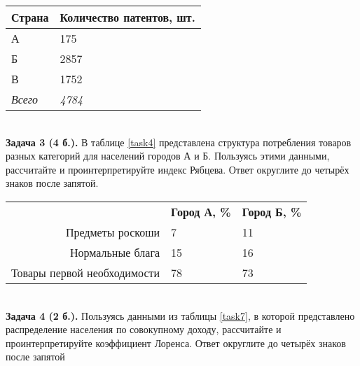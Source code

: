 \documentclass{article}
\begin{document}
\begin{minipage}{\textwidth}
\centering
\begin{tabularx}{0.4\textwidth}{YY}
\toprule
\textbf{Страна} & \textbf{Количество патентов, шт.} \\
\midrule
А & 175 \\

Б & 2857 \\

В & 1752 \\
\addlinespace
\textit{Всего} & \textit{4784} \\
\bottomrule
\end{tabularx}
\label{task9}
\end{minipage} \\[35pt]

\textbf{Задача 3 (4 б.).} В таблице \ref{task4} представлена структура потребления товаров разных категорий для населений городов А и Б. Пользуясь этими данными, рассчитайте и проинтерпретируйте индекс Рябцева. Ответ округлите до четырёх знаков после запятой.\\

\begin{minipage}{\textwidth}
\centering
\begin{tabularx}{0.7\textwidth}{rYY}
\toprule
 & \textbf{Город А, \%} & \textbf{Город Б, \%} \\
\cmidrule(lr){2-2}\cmidrule(lr){3-3}
Предметы роскоши & 7 & 11 \\

Нормальные блага & 15 & 16 \\

Товары первой необходимости & 78 & 73 \\
\bottomrule
\end{tabularx}
\label{task4}
\end{minipage} \\[35pt]

\textbf{Задача 4 (2 б.).} Пользуясь данными из таблицы \ref{task7}, в которой представлено распределение населения по совокупному доходу, рассчитайте и проинтерпретируйте коэффициент Лоренса. Ответ округлите до четырёх знаков после запятой\\
\end{document}
